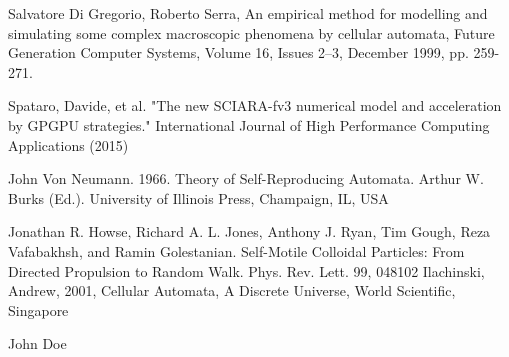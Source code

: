 \documentclass[conference]{IEEEtran}
\begin{document}
\begin{thebibliography}{1}
Salvatore Di Gregorio, Roberto Serra, An empirical method for modelling and simulating some complex macroscopic phenomena by cellular automata, Future Generation Computer Systems, Volume 16, Issues 2–3, December 1999, pp. 259-271.

Spataro, Davide, et al. "The new SCIARA-fv3 numerical model and acceleration by GPGPU strategies." International Journal of High Performance Computing Applications (2015)


John Von Neumann. 1966. Theory of Self-Reproducing Automata. Arthur W. Burks (Ed.). University of Illinois Press, Champaign, IL, USA

Jonathan R. Howse, Richard A. L. Jones, Anthony J. Ryan, Tim Gough, Reza Vafabakhsh, and Ramin Golestanian. Self-Motile Colloidal Particles: From Directed Propulsion to Random Walk. Phys. Rev. Lett. 99, 048102
Ilachinski, Andrew, 2001, Cellular Automata, A Discrete Universe, World Scientific,
Singapore

\end{thebibliography}

% 

\begin{IEEEbiography}{John Doe}
\blindtext
\end{IEEEbiography}



\end{document}
